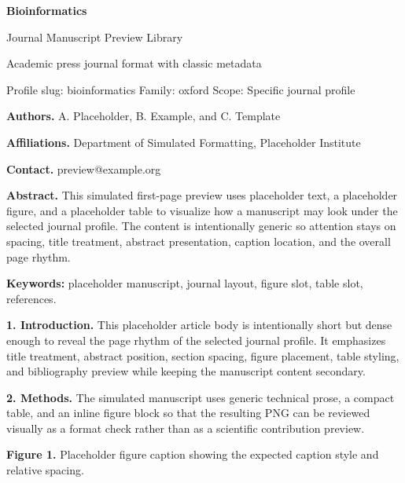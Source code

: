 \documentclass[10pt,a4paper]{article}
\begin{document}
\begin{center}
{\LARGE\bfseries Bioinformatics}\par
\vspace{0.25em}
{\small Journal Manuscript Preview Library}\par
\vspace{0.15em}
{\footnotesize Academic press journal format with classic metadata}\par
\vspace{0.2em}
{\footnotesize Profile slug: bioinformatics \quad Family: oxford \quad Scope: Specific journal profile}
\end{center}
\vspace{0.2em}



\noindent\textbf{Authors.} A. Placeholder, B. Example, and C. Template\par
\noindent\textbf{Affiliations.} Department of Simulated Formatting, Placeholder Institute\par
\noindent\textbf{Contact.} preview@example.org\par
\vspace{0.4em}
\noindent\textbf{Abstract.} This simulated first-page preview uses placeholder text, a placeholder figure, and a placeholder table to visualize how a manuscript may look under the selected journal profile. The content is intentionally generic so attention stays on spacing, title treatment, abstract presentation, caption location, and the overall page rhythm.\par\vspace{0.6em}
\noindent\textbf{Keywords:} placeholder manuscript, journal layout, figure slot, table slot, references.\par\vspace{0.6em}


\small
\textbf{1. Introduction.} This placeholder article body is intentionally short but dense enough to reveal the page rhythm of the selected journal profile. It emphasizes title treatment, abstract position, section spacing, figure placement, table styling, and bibliography preview while keeping the manuscript content secondary.

\textbf{2. Methods.} The simulated manuscript uses generic technical prose, a compact table, and an inline figure block so that the resulting PNG can be reviewed visually as a format check rather than as a scientific contribution preview.


\begin{center}\end{center}\noindent\textbf{Figure 1.} Placeholder figure caption showing the expected caption style and relative spacing.\par\vspace{0.5em}
\end{document}

